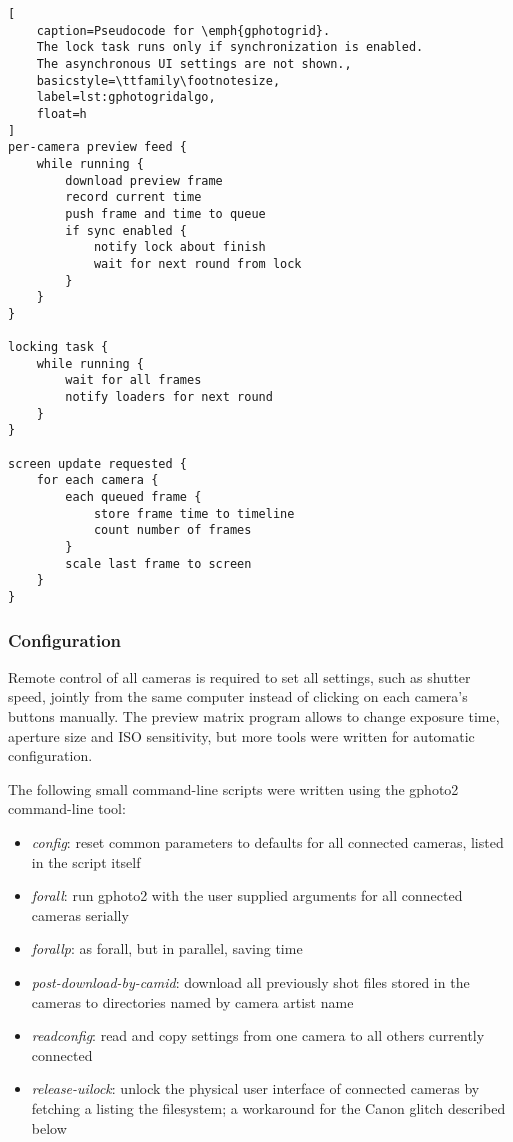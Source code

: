 \begin{lstlisting}[
	caption=Pseudocode for \emph{gphotogrid}.
	The lock task runs only if synchronization is enabled.
	The asynchronous UI settings are not shown.,
	basicstyle=\ttfamily\footnotesize,
	label=lst:gphotogridalgo,
	float=h
]
per-camera preview feed {
	while running {
		download preview frame
		record current time
		push frame and time to queue
		if sync enabled {
			notify lock about finish
			wait for next round from lock
		}
	}
}

locking task {
	while running {
		wait for all frames
		notify loaders for next round
	}
}

screen update requested {
	for each camera {
		each queued frame {
			store frame time to timeline
			count number of frames
		}
		scale last frame to screen
	}
}
\end{lstlisting}

\subsubsection{Configuration} %

Remote control of all cameras is required to set all settings, such as shutter speed, jointly from the same computer instead of clicking on each camera's buttons manually.
The preview matrix program allows to change exposure time, aperture size and ISO sensitivity, but more tools were written for automatic configuration.

The following small command-line scripts were written using the gphoto2 command-line tool:

\begin{itemize}
	\item \emph{config}: reset common parameters to defaults for all connected cameras, listed in the script itself
	\item \emph{forall}: run gphoto2 with the user supplied arguments for all connected cameras serially
	\item \emph{forallp}: as forall, but in parallel, saving time
	\item \emph{post-download-by-camid}: download all previously shot files stored in the cameras to directories named by camera artist name
	\item \emph{readconfig}: read and copy settings from one camera to all others currently connected
	\item \emph{release-uilock}: unlock the physical user interface of connected cameras by fetching a listing the filesystem; a workaround for the Canon glitch described below
\end{itemize}

